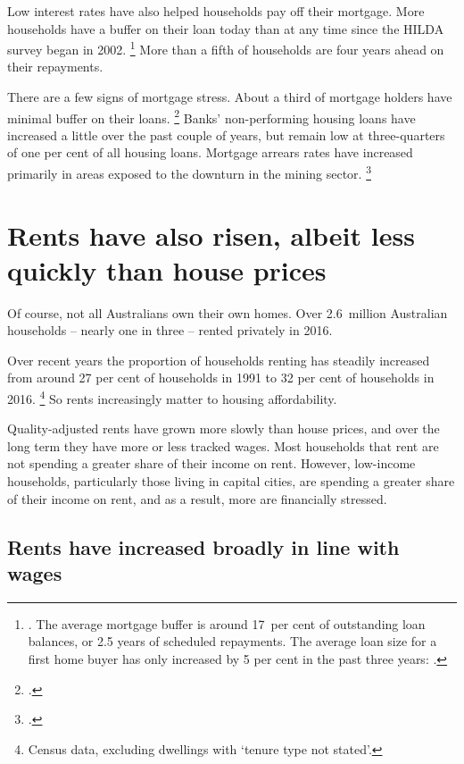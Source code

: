 Low interest rates have also helped households pay off their mortgage.
More households have a buffer on their loan today than at any time since the HILDA survey began in 2002.%
	\footnote{\textcite[][Box~C, p.~20--21]{RBAFinancialStabilityApril2017}. The average mortgage buffer is around 17~per cent of outstanding loan balances, or 2.5 years of scheduled repayments.
	The average loan size for a first home buyer has only increased by 5 per cent in the past three years: \textcite{ABSHousingFinanceAustraliaAugust2017}.}
More than a fifth of households are four years ahead on their repayments.

There are a few signs of mortgage stress. About a third of mortgage holders have minimal buffer on their loans.%
	\footcite{Lowe2017Householddebt}
Banks' non-performing housing loans have increased a little over the past couple of years, but remain low at three-quarters of one per cent of all housing loans.
Mortgage arrears rates have increased primarily in areas exposed to the downturn in the mining sector.%
	\footcite{Kent2017innovativemortgagedata}

\section{Rents have also risen, albeit less quickly than house prices}\label{sec:rents-have-also-risen-albeit-less-quickly-than-house-prices}

Of course, not all Australians own their own homes.
Over 2.6~million Australian households -- nearly one in three -- rented privately in 2016.

Over recent years the proportion of households renting has steadily increased from around 27 per cent of households in 1991 to 32 per cent of households in 2016.%
	\footnote{Census data, excluding dwellings with `tenure type not stated'.}
So rents increasingly matter to housing affordability.

Quality-adjusted rents have grown more slowly than house prices, and over the long term they have more or less tracked wages.
Most households that rent are not spending a greater share of their income on rent.
However, low-income households, particularly those living in capital cities, are spending a greater share of their income on rent, and as a result, more are financially stressed.

\subsection{Rents have increased broadly in line with wages}\label{subsec:rents-have-increased-broadly-in-line-with-wages}

